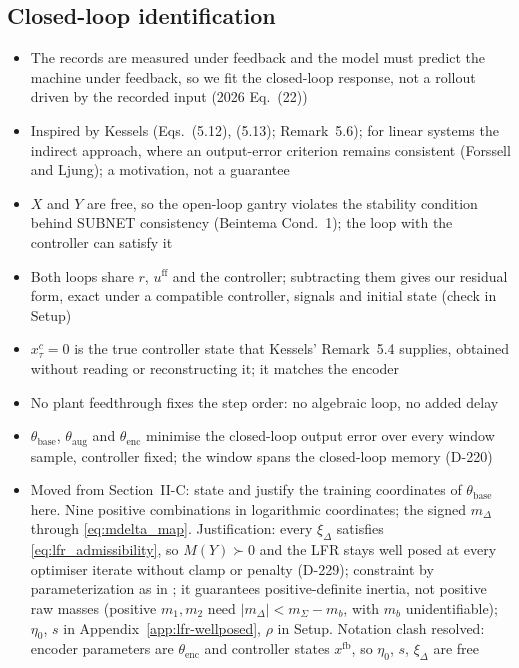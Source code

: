 \subsection{Closed-loop identification}\label{sec:aug_closed_loop}
\ifdraft
\begin{itemize}
\item The records are measured under feedback and the model must predict the machine under feedback, so we fit the closed-loop response, not a rollout driven by the recorded input (2026 Eq.~(22))
\item Inspired by Kessels (Eqs.~(5.12), (5.13); Remark~5.6); for linear systems the indirect approach, where an output-error criterion remains consistent (Forssell and Ljung); a motivation, not a guarantee
\item $X$ and $Y$ are free, so the open-loop gantry violates the stability condition behind SUBNET consistency (Beintema Cond.~1); the loop with the controller can satisfy it
\item Both loops share $r$, $u^{\mathrm{ff}}$ and the controller; subtracting them gives our residual form, exact under a compatible controller, signals and initial state (check in Setup)
\item $x^{c}_\tau=0$ is the true controller state that Kessels' Remark~5.4 supplies, obtained without reading or reconstructing it; it matches the encoder
\item No plant feedthrough fixes the step order: no algebraic loop, no added delay
\item $\theta_{\mathrm{base}}$, $\theta_{\mathrm{aug}}$ and $\theta_{\mathrm{enc}}$ minimise the closed-loop output error over every window sample, controller fixed; the window spans the closed-loop memory (D-220)
\item Moved from Section~II-C: state and justify the training coordinates of $\theta_{\mathrm{base}}$ here. Nine positive combinations in logarithmic coordinates; the signed $m_\Delta$ through \eqref{eq:mdelta_map}. Justification: every $\xi_\Delta$ satisfies \eqref{eq:lfr_admissibility}, so $M(Y)\succ0$ and the LFR stays well posed at every optimiser iterate without clamp or penalty (D-229); constraint by parameterization as in \cite{sutanto2020encoding}; it guarantees positive-definite inertia, not positive raw masses (positive $m_1,m_2$ need $|m_\Delta|<m_\Sigma-m_b$, with $m_b$ unidentifiable); $\eta_0$, $s$ in Appendix~\ref{app:lfr-wellposed}, $\rho$ in Setup. Notation clash resolved: encoder parameters are $\theta_{\mathrm{enc}}$ and controller states $x^{\mathrm{fb}}$, so $\eta_0$, $s$, $\xi_\Delta$ are free

\end{itemize}
